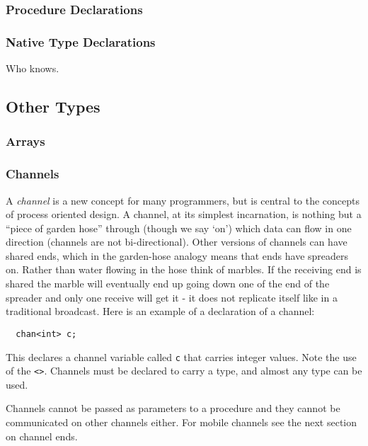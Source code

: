 \documentclass[pdflatex,11pt,letter]{article}
\begin{document}



\subsubsection{Procedure Declarations}


\subsubsection{Native Type Declarations}

Who knows.
\subsection{Other Types}

\subsubsection{Arrays}
\subsubsection{Channels}

A {\em channel} is a new concept for many programmers, but is central to the concepts of process oriented design. A channel, at its simplest incarnation, is nothing but a ``piece of garden hose'' through (though we say `on') which data can flow in one direction (channels are not bi-directional). Other versions of channels can have shared ends, which in the garden-hose analogy means that ends have spreaders on. Rather than water flowing in the hose think of marbles. If the receiving end is shared the marble will eventually end up going down one of the end of the spreader and only one receive will get it - it does not replicate itself like in a traditional broadcast. Here is an example of a declaration of a channel:
\begin{verbatim}
  chan<int> c;
\end{verbatim}
This declares a channel variable called {\tt c} that carries integer values. Note the use of the {\tt <>}. Channels must be declared to carry a type, and almost any type can be used. %

Channels cannot be passed as parameters to a procedure and they cannot be communicated on other channels either. For mobile channels see the next section on channel ends.

\end{document}
